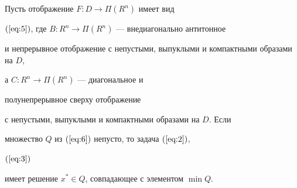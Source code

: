 \begin{thms}\label{thm:1}


Пусть отображение $F: D \to \Pi (R^{n})$ имеет вид


$(\ref{eq:5})$, где $B: R^n \to \Pi (R^n)$ --- внедиагонально антитонное


и непрерывное отображение с непустыми, выпуклыми и компактными образами на $D$,


а $C: R^n \to \Pi (R^n)$ --- диагональное и


полунепрерывное сверху отображение


с непустыми, выпуклыми и компактными образами на $D$. Если


множество $Q$ из $(\ref{eq:6})$ непусто, то задача $(\ref{eq:2})$, 


$(\ref{eq:3})$


имеет решение $x^* \in Q$, совпадающее с элементом $\min Q$.


\end{thms}








